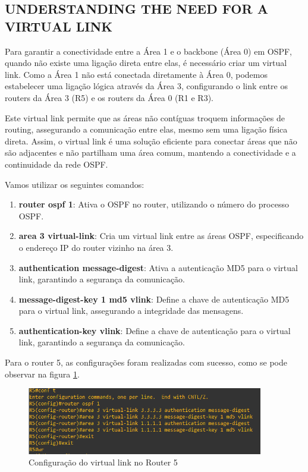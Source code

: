 \documentclass[11pt,english, openright, oneside]{book}
\begin{document}
\subsection{UNDERSTANDING THE NEED FOR A VIRTUAL LINK}
\vspace{0.2cm}

Para garantir a conectividade entre a Área 1 e o backbone (Área 0) em OSPF, quando não existe uma ligação direta entre elas, é necessário criar um virtual link. Como a Área 1 não está conectada diretamente à Área 0, podemos estabelecer uma ligação lógica através da Área 3, configurando o link entre os routers da Área 3 (R5) e os routers da Área 0 (R1 e R3).

Este virtual link permite que as áreas não contíguas troquem informações de routing, assegurando a comunicação entre elas, mesmo sem uma ligação física direta. Assim, o virtual link é uma solução eficiente para conectar áreas que não são adjacentes e não partilham uma área comum, mantendo a conectividade e a continuidade da rede OSPF.
\vspace{0.2cm}

Vamos utilizar os seguintes comandos:
\vspace{0.2cm}

\begin{enumerate}
  \item \textbf{router ospf 1}: Ativa o OSPF no router, utilizando o número do processo OSPF.
  \item \textbf{area 3 virtual-link}: Cria um virtual link entre as áreas OSPF, especificando o endereço IP do router vizinho na área 3.
  \item \textbf{authentication message-digest}: Ativa a autenticação MD5 para o virtual link, garantindo a segurança da comunicação.
  \item \textbf{message-digest-key 1 md5 vlink}: Define a chave de autenticação MD5 para o virtual link, assegurando a integridade das mensagens.
  \item \textbf{authentication-key vlink}: Define a chave de autenticação para o virtual link, garantindo a segurança da comunicação.
\end{enumerate}
\vspace{0.2cm}

Para o router 5, as configurações foram realizadas com sucesso, como se pode observar na figura \ref{fig:config20}.
\vspace{0.2cm}

\begin{figure}[H]
    \centering
    \includegraphics[width=0.92\textwidth]{imagens/Tarefa3/13.virtual_link_R5.png}
    \caption{Configuração do virtual link no Router 5}
    \label{fig:config20}
\end{figure}
\vspace{0.2cm}
\end{document}
